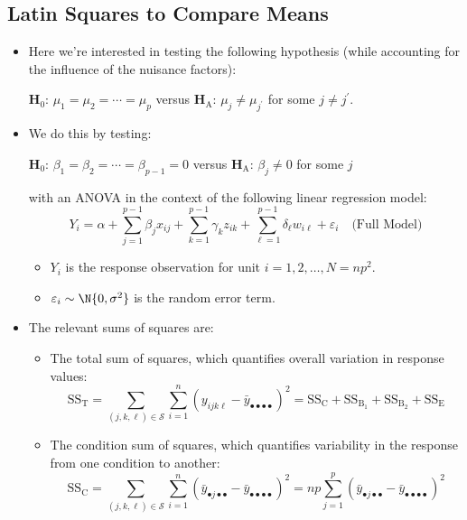 \subsection{Latin Squares to Compare Means}
\begin{itemize}
    \item Here we're interested in testing the following hypothesis (while accounting for the influence of the
          nuisance factors):
          \begin{tightcenter}
              $ \mathbf{H}_0 $: $ \mu_1=\mu_2=\cdots=\mu_p $ versus $ \mathbf{H}_\text{A} $: $ \mu_j\ne \mu_{j^\prime} $ for some $ j\ne j^\prime $.
          \end{tightcenter}
    \item We do this by testing:
          \begin{tightcenter}
              $ \mathbf{H}_0 $: $ \beta_1=\beta_2=\cdots=\beta_{p-1}=0 $ versus $ \mathbf{H}_\text{A} $: $ \beta_j\ne 0$ for some $ j $
          \end{tightcenter}
          with an ANOVA in the context of the following linear regression model:
          \[ Y_i=\alpha+\sum_{j=1}^{p-1} \beta_j x_{ij}+\sum_{k=1}^{p-1} \gamma_k z_{ik}+\sum_{\ell=1}^{p-1} \delta_\ell w_{i\ell}+\varepsilon_i\quad \text{(Full Model)} \]
          \begin{itemize}
              \item $ Y_i $ is the response observation for unit $ i=1,2,\ldots,N=np^2 $.
              \item $ \varepsilon_i \sim \N{0,\sigma^2} $ is the random error term.
          \end{itemize}
    \item The relevant sums of squares are:
          \begin{itemize}
              \item The total sum of squares, which quantifies overall variation in response values:
                    \[ \text{SS}_\text{T}=\sum_{(j,k,\ell)\in \mathcal{S}}\sum_{i=1}^{n} (y_{ijk\ell}-\bar{y}_{\bullet\bullet\bullet\bullet})^2=\text{SS}_{\text{C}}+\text{SS}_{\text{B}_1}+\text{SS}_{\text{B}_2}+\text{SS}_{\text{E}}  \]
              \item The condition sum of squares, which quantifies variability in the response from one condition to another:
                    \[ \text{SS}_{\text{C}}=\sum_{(j,k,\ell)\in \mathcal{S}}\sum_{i=1}^{n} (\bar{y}_{\bullet j\bullet\bullet}-\bar{y}_{\bullet\bullet\bullet\bullet})^2=np \sum_{j=1}^{p} (\bar{y}_{\bullet j\bullet\bullet}-\bar{y}_{\bullet\bullet\bullet\bullet})^2  \]

\end{itemize}
\end{itemize}
